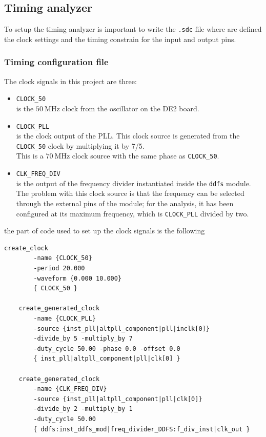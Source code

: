 \newpage

\subsection{Timing analyzer}
To setup the timing analyzer is important to write the \texttt{.sdc} file where are defined the clock settings and the timing constrain for the input and output pins.

\subsubsection{Timing configuration file}
The clock signals in this project are three:

\begin{itemize}
    \item \texttt{CLOCK\_50} \\
    is the \(50\ \text{MHz}\) clock from the oscillator on the DE2 board.

    \item \texttt{CLOCK\_PLL} \\
    is the clock output of the PLL. This clock source is generated from the \texttt{CLOCK\_50} clock by multiplying it by 7/5.\\
    This is a \(70\ \text{MHz}\) clock source with the same phase as \texttt{CLOCK\_50}.

    \item \texttt{CLK\_FREQ\_DIV} \\
    is the output of the frequency divider instantiated inside the \texttt{ddfs} module.\\
    The problem with this clock source is that the frequency can be selected through the external pins of the module; for the analysis, it has been configured at its maximum frequency, which is \texttt{CLOCK\_PLL} divided by two.

\end{itemize}

\noindent
the part of code used to set up the clock signals is the following

\vspace{0.5cm}
\begin{lstlisting}[language=sdc, caption=Clock settings for timing analyzer]
    create_clock 
        -name {CLOCK_50} 
        -period 20.000 
        -waveform {0.000 10.000} 
        { CLOCK_50 }
        
    create_generated_clock 
        -name {CLOCK_PLL} 
        -source {inst_pll|altpll_component|pll|inclk[0]}
        -divide_by 5 -multiply_by 7
        -duty_cycle 50.00 -phase 0.0 -offset 0.0 
        { inst_pll|altpll_component|pll|clk[0] }
        
    create_generated_clock 
        -name {CLK_FREQ_DIV} 
        -source {inst_pll|altpll_component|pll|clk[0]} 
        -divide_by 2 -multiply_by 1 
        -duty_cycle 50.00 
        { ddfs:inst_ddfs_mod|freq_divider_DDFS:f_div_inst|clk_out }
    
\end{lstlisting}
\vspace{0.5cm}

